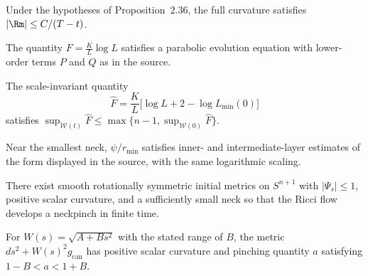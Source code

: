 \begin{lemma}
\label{ch02-lem-neckpinch-typei-bound}
Under the hypotheses of Proposition~2.36, the full curvature satisfies
\(|\Rm|\le C/(T-t)\).
\end{lemma}

\begin{lemma}
\label{ch02-lem-neckpinch-F-evolution}
The quantity \(F=\frac{K}{L}\log L\) satisfies a parabolic evolution equation
with lower-order terms \(P\) and \(Q\) as in the source.
\end{lemma}

\begin{lemma}
\label{ch02-lem-neckpinch-Fhat-bound}
The scale-invariant quantity
\[
\hat F=\frac{K}{L}\bigl[\log L+2-\log L_{\min}(0)\bigr]
\]
satisfies \(\sup_{\mathcal W(t)}\hat F\le \max\{n-1,\sup_{\mathcal W(0)}\hat F\}\).
\end{lemma}

\begin{lemma}
\label{ch02-lem-neckpinch-neck-profile-estimates}
Near the smallest neck, \(\psi/r_{\min}\) satisfies inner- and
intermediate-layer estimates of the form displayed in the source, with the
same logarithmic scaling.
\end{lemma}

\begin{proposition}
\label{ch02-prop-neckpinch-happen}
There exist smooth rotationally symmetric initial metrics on \(S^{n+1}\) with
\(|\Psi_s|\le 1\), positive scalar curvature, and a sufficiently small neck so
that the Ricci flow develops a neckpinch in finite time.
\end{proposition}

\begin{lemma}
\label{ch02-lem-neckpinch-bump-model}
For \(W(s)=\sqrt{A+Bs^2}\) with the stated range of \(B\), the metric
\(ds^2+W(s)^2g_{\mathrm{can}}\) has positive scalar curvature and pinching
quantity \(a\) satisfying \(1-B<a<1+B\).
\end{lemma}

